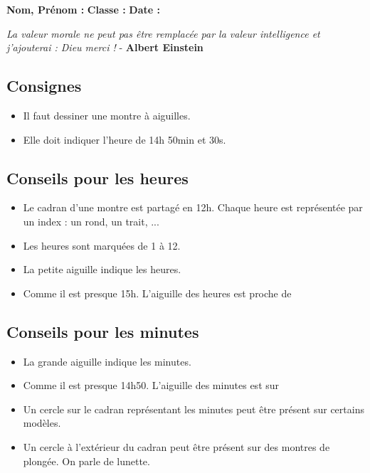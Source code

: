 



\textbf{Nom, Prénom :} \hspace{8cm} \textbf{Classe :} \hspace{3cm} \textbf{Date :}\\

\vspace{-0.5cm} \begin{center}
  \textit{La valeur morale ne peut pas être remplacée par la valeur intelligence et j'ajouterai : Dieu merci !}  - \textbf{Albert Einstein}
\end{center}

\subsection*{Consignes}

\begin{itemize}[label={$\bullet$}]
  \item Il faut dessiner une montre à aiguilles.
  \item Elle doit indiquer l'heure de 14h 50min et 30s.
\end{itemize}

\subsection*{Conseils pour les heures}

\begin{itemize}[label={$\bullet$}]
  \item Le cadran d'une montre est partagé en 12h. Chaque heure est représentée par un index :  un rond, un trait, ...
  \item Les heures sont marquées de 1 à 12.
  \item La petite aiguille indique les heures. 
  \item Comme il est presque 15h. L'aiguille des heures est proche de \dotfill
\end{itemize}

\subsection*{Conseils pour les minutes}

\begin{itemize}[label={$\bullet$}]
  \item La grande aiguille indique les minutes. 
  \item Comme il est presque 14h50. L'aiguille des minutes est sur \dotfill
  \item Un cercle sur le cadran représentant les minutes peut être présent sur certains modèles. 
  \item Un cercle à l'extérieur du cadran peut être présent sur des montres de plongée. On parle de lunette.
\end{itemize}

